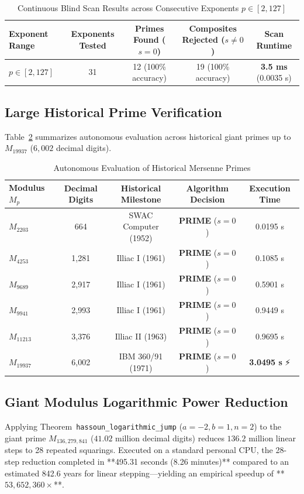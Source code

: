 \documentclass[11pt,a4paper]{article}
\theoremstyle{definition}
\begin{document}
\begin{table}[t]
\centering
\caption{Continuous Blind Scan Results across Consecutive Exponents $p \in [2, 127]$}
\label{tab:continuous_scan}
\begin{tabular}{lcccc}
\toprule
\textbf{Exponent Range} & \textbf{Exponents Tested} & \textbf{Primes Found ($s=0$)} & \textbf{Composites Rejected ($s\neq0$)} & \textbf{Scan Runtime} \\
\midrule
$p \in [2, 127]$ & 31 & 12 (100\% accuracy) & 19 (100\% accuracy) & \textbf{3.5 ms} (0.0035 s) \\
\bottomrule
\end{tabular}
\end{table}

\subsection{Large Historical Prime Verification}
Table~\ref{tab:historical} summarizes autonomous evaluation across historical giant primes up to $M_{19937}$ ($6,002$ decimal digits).

\begin{table}[h]
\centering
\caption{Autonomous Evaluation of Historical Mersenne Primes}
\label{tab:historical}
\begin{tabular}{lcccc}
\toprule
\textbf{Modulus $M_p$} & \textbf{Decimal Digits} & \textbf{Historical Milestone} & \textbf{Algorithm Decision} & \textbf{Execution Time} \\
\midrule
$M_{2203}$ & 664 & SWAC Computer (1952) & \textbf{PRIME} ($s=0$) & 0.0195 s \\
$M_{4253}$ & 1,281 & Illiac I (1961) & \textbf{PRIME} ($s=0$) & 0.1085 s \\
$M_{9689}$ & 2,917 & Illiac I (1961) & \textbf{PRIME} ($s=0$) & 0.5901 s \\
$M_{9941}$ & 2,993 & Illiac I (1961) & \textbf{PRIME} ($s=0$) & 0.9449 s \\
$M_{11213}$ & 3,376 & Illiac II (1963) & \textbf{PRIME} ($s=0$) & 0.9695 s \\
$M_{19937}$ & 6,002 & IBM 360/91 (1971) & \textbf{PRIME} ($s=0$) & \textbf{3.0495 s} ⚡ \\
\bottomrule
\end{tabular}
\end{table}

\subsection{Giant Modulus Logarithmic Power Reduction}
Applying Theorem~\texttt{hassoun\_logarithmic\_jump} ($a = -2, b = 1, n = 2$) to the giant prime $M_{136,279,841}$ ($41.02$ million decimal digits) reduces $136.2$ million linear steps to 28 repeated squarings. Executed on a standard personal CPU, the 28-step reduction completed in **495.31 seconds (8.26 minutes)** compared to an estimated 842.6 years for linear stepping—yielding an empirical speedup of **$53,652,360\times$**.
\end{document}
